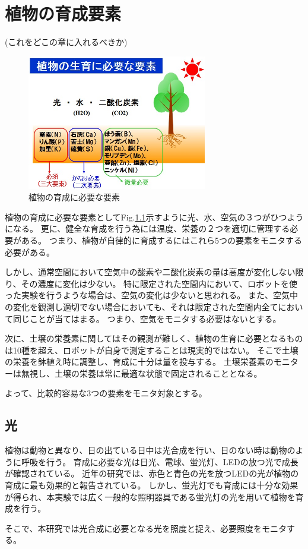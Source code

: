 \chapter{植物の育成要素}
(これをどこの章に入れるべきか)
\begin{figure}[b] 
    \centering
    \includegraphics[width=0.7\textwidth]{image/plants/283856.jpg}
    \caption{植物の育成に必要な要素}
    \label{plants_youso}
\end{figure}
植物の育成に必要な要素としてFig.\ref{plants_youso}示すように光、水、空気の３つがひつようになる。
更に、健全な育成を行う為には温度、栄養の２つを適切に管理する必要がある。
つまり、植物が自律的に育成するにはこれら5つの要素をモニタする必要がある。
\par しかし、通常空間において空気中の酸素や二酸化炭素の量は高度が変化しない限り、その濃度に変化は少ない。
特に限定された空間内において、ロボットを使った実験を行うような場合は、空気の変化は少ないと思われる。
また、空気中の変化を観測し適切でない場合においても、それは限定された空間内全てにおいて同じことが当てはまる。
つまり、空気をモニタする必要はないとする。
\par 次に、土壌の栄養素に関してはその観測が難しく、植物の生育に必要となるものは10種を超え、ロボットが自身で測定することは現実的ではない。
そこで土壌の栄養を鉢植え時に調整し、育成に十分は量を投与する。
土壌栄養素のモニターは無視し、土壌の栄養は常に最適な状態で固定されることとなる。
\par よって、比較的容易な3つの要素をモニタ対象とする。
\section{光}
植物は動物と異なり、日の出ている日中は光合成を行い、日のない時は動物のように呼吸を行う。
育成に必要な光は日光、電球、蛍光灯、LEDの放つ光で成長が確認されている。
近年の研究では、赤色と青色の光を放つLEDの光が植物の育成に最も効果的と報告されている。
しかし、蛍光灯でも育成には十分な効果が得られ、本実験では広く一般的な照明器具である蛍光灯の光を用いて植物を育成を行う。
\par そこで、本研究では光合成に必要となる光を照度と捉え、必要照度をモニタする。
